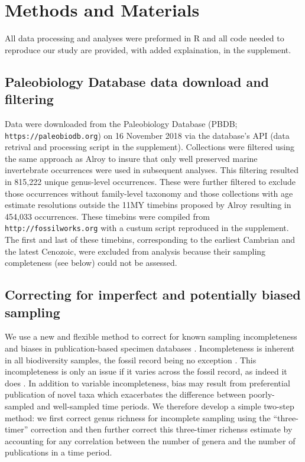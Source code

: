 \documentclass[12pt]{article}
\let\citep=\cite
\begin{document}
\section{Methods and Materials}

All data processing and analyses were preformed in R \citep{rcite} and
all code needed to reproduce our study are provided, with added
explaination, in the supplement.

\subsection{Paleobiology Database data download and filtering}
Data were downloaded from the Paleobiology Database (PBDB; {\tt
  https://paleobiodb.org}) on 16 November 2018 via the database's API
(data retrival and processing script in the supplement). Collections
were filtered using the same approach as Alroy \citep{alroy08} to
insure that only well preserved marine invertebrate occurrences were
used in subsequent analyses. This filtering resulted in 815,222 unique
genus-level occurrences. These were further filtered to exclude those
occurrences without family-level taxonomy and those collections with
age estimate resolutions outside the 11MY timebins proposed by Alroy
\citep{alroy08} resulting in 454,033 occurrences. These timebins were
compiled from {\tt http://fossilworks.org} with a custum script
reproduced in the supplement. The first and last of these timebins,
corresponding to the earliest Cambrian and the latest Cenozoic, were
excluded from analysis because their sampling completeness (see below)
could not be assessed.


\subsection{Correcting for imperfect and potentially biased sampling}
\label{sec:3TP}
We use a new and flexible method to correct for known sampling
incompleteness and biases in publication-based specimen databases
\citep{alroy08, alroy2010}. Incompleteness is inherent in all
biodiversity samples, the fossil record being no exception
\citep{miller1996, foote2016, starrfelt2016, close2018}. This
incompleteness is only an issue if it varies across the fossil record,
as indeed it does \citep{miller1996 , foote2016, starrfelt2016,
  close2018}.  In addition to variable incompleteness, bias may result
from preferential publication of novel taxa \citep{alroy2010} which
exacerbates the difference between poorly-sampled and well-sampled
time periods. We therefore develop a simple two-step method: we first
correct genus richness for incomplete sampling using the
``three-timer'' correction \citep{alroy08} and then further correct
this three-timer richenss estimate by accounting for any correlation
between the number of genera and the number of publications in a time
period.
\end{document}
